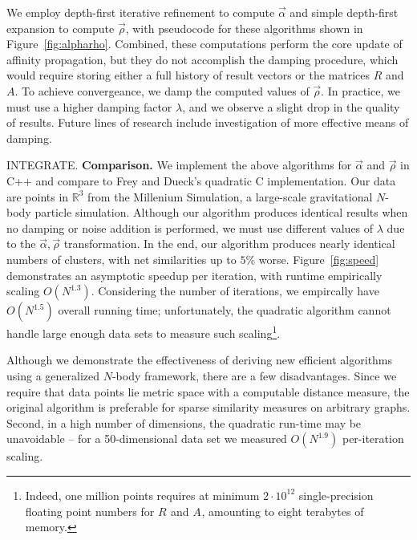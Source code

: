 \documentclass{article}
\newcommand{\respo}[2]{R_{#1#2}}
\newcommand{\avail}[2]{A_{#1#2}}
\newcommand{\vecrho}{\vec{\rho}}
\newcommand{\vecalpha}{\vec{\alpha}}
\begin{document}
We employ depth-first iterative refinement to compute $\vecalpha$ and
simple depth-first expansion to compute $\vecrho$, with pseudocode for
these algorithms shown in Figure~\ref{fig:alpharho}.  Combined, these
computations perform the core update of affinity propagation, but they
do not accomplish the damping procedure, which would require storing
either a full history of result vectors or the matrices $R$ and $A$.
To achieve convergeance, we damp the computed values of $\vecrho$.  In
practice, we must use a higher damping factor $\lambda$, and we
observe a slight drop in the quality of results.  Future lines of
research include investigation of more effective means of damping.

INTEGRATE. {\bf Comparison.}  We implement the above algorithms for
$\vecalpha$ and $\vecrho$ in C++ and compare to Frey and Dueck's
quadratic C implementation.  Our data are points in $\mathbb{R}^3$
from the Millenium Simulation, a large-scale gravitational $N$-body
particle simulation\cite{simulation}.  Although our algorithm produces
identical results when no damping or noise addition is performed, we
must use different values of $\lambda$ due to the $\vecalpha,\vecrho$
transformation.  In the end, our algorithm produces nearly identical
numbers of clusters, with net similarities up to $5\%$ worse.
Figure~\ref{fig:speed} demonstrates an asymptotic speedup per
iteration, with runtime empirically scaling $O(N^{1.3})$.  Considering
the number of iterations, we empircally have $O(N^{1.5})$ overall
running time; unfortunately, the quadratic algorithm cannot handle
large enough data sets to measure such scaling\footnote{Indeed, one
million points requires at minimum $2 \cdot 10^{12}$ single-precision
floating point numbers for $\respo{}{}$ and $\avail{}{}$, amounting to
eight terabytes of memory.}.

Although we demonstrate the effectiveness of deriving new efficient algorithms using a generalized $N$-body framework, there are a few disadvantages.
Since we require that data points lie metric space with a computable distance measure, the original algorithm is preferable for sparse similarity measures on arbitrary graphs.
Second, in a high number of dimensions, the quadratic run-time may be unavoidable -- for a 50-dimensional data set we measured $O(N^{1.9})$ per-iteration scaling.
\end{document}
